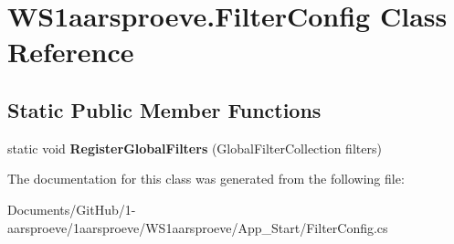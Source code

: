 \hypertarget{class_w_s1aarsproeve_1_1_filter_config}{}\section{W\+S1aarsproeve.\+Filter\+Config Class Reference}
\label{class_w_s1aarsproeve_1_1_filter_config}
\subsection*{Static Public Member Functions}
\begin{DoxyCompactItemize}
\item 
\hypertarget{class_w_s1aarsproeve_1_1_filter_config_a79fefc6789d5950c86ccd0fba0a40cb3}{}static void {\bfseries Register\+Global\+Filters} (Global\+Filter\+Collection filters)\label{class_w_s1aarsproeve_1_1_filter_config_a79fefc6789d5950c86ccd0fba0a40cb3}

\end{DoxyCompactItemize}


The documentation for this class was generated from the following file\+:\begin{DoxyCompactItemize}
\item 
Documents/\+Git\+Hub/1-\/aarsproeve/1aarsproeve/\+W\+S1aarsproeve/\+App\+\_\+\+Start/Filter\+Config.\+cs\end{DoxyCompactItemize}
